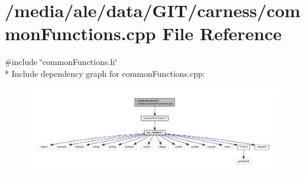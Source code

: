 \hypertarget{a00069}{\section{/media/ale/data/\-G\-I\-T/carness/common\-Functions.cpp File Reference}
\label{a00069}
}
{\ttfamily \#include \char`\"{}common\-Functions.\-h\char`\"{}}\\*
Include dependency graph for common\-Functions.\-cpp\-:\nopagebreak
\begin{figure}[H]
\begin{center}
\leavevmode
\includegraphics[width=350pt]{a00136}
\end{center}
\end{figure}
